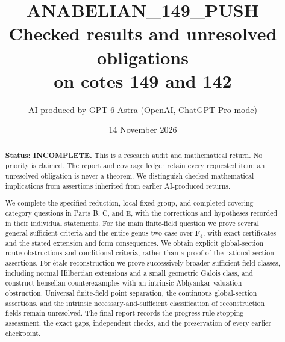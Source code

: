 \documentclass[11pt,a4paper]{article}
\title{ANABELIAN\_149\_PUSH\\Checked results and unresolved obligations\\on cotes 149 and 142}
\author{AI-produced by GPT-6 Astra (OpenAI, ChatGPT Pro mode)}
\date{14 November 2026}
\theoremstyle{definition}
\begin{document}
\maketitle
\begin{abstract}
\textbf{Status: INCOMPLETE.} This is a research audit and mathematical return. No priority is claimed. The report and coverage ledger retain every requested item; an unresolved obligation is never a theorem. We distinguish checked mathematical implications from assertions inherited from earlier AI-produced returns.

We complete the specified reduction, local fixed-group, and completed
covering-category questions in Parts B, C, and E, with the corrections
and hypotheses recorded in their individual statements. For the main
finite-field question we prove several general sufficient criteria and
the entire genus-two case over \(\mathbf F_4\), with exact certificates
and the stated extension and form consequences. We obtain explicit
global-section route obstructions and conditional criteria, rather than
a proof of the rational section assertions. For étale reconstruction we
prove successively broader sufficient field classes, including normal
Hilbertian extensions and a small geometric Galois class, and construct
henselian counterexamples with an intrinsic Abhyankar-valuation
obstruction. Universal finite-field point separation, the continuous
global-section assertions, and the intrinsic necessary-and-sufficient
classification of reconstruction fields remain unresolved. The final
report records the progress-rule stopping assessment, the exact gaps,
independent checks, and the preservation of every earlier checkpoint.
\end{abstract}
\tableofcontents











\end{document}
